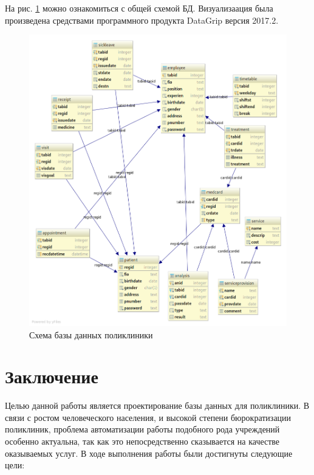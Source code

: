 \documentclass[14pt,a4paper,russian]{extreport}
\begin{document}
На рис. \ref{fig:clinic} можно ознакомиться с общей схемой БД. Визуализаация была
произведена средствами программного продукта DataGrip версия 2017.2.
\begin{figure}[h!]
        \includegraphics[scale=0.52]{clinic}
        \caption{Схема базы данных поликлиники}
        \label{fig:clinic}
\end{figure}


\chapter*{Заключение}
Целью данной работы является проектирование базы данных для поликлиники. 
В связи с ростом человеческого населения, и высокой степени бюрократизации поликлиник, проблема
автоматизации работы подобного рода учреждений особенно актуальна, так как это непосредственно
сказывается на качестве оказываемых услуг. В ходе выполнения работы были достигнуты следующие цели: 
\end{document}
